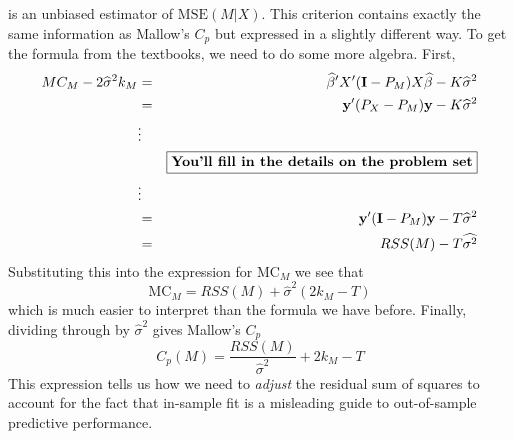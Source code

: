 \documentclass[12pt]{article}
\theoremstyle{definition}
\begin{document}
is an unbiased estimator of $\mbox{MSE}(M|X)$. This criterion contains exactly the same information as Mallow's $C_p$ but expressed in a slightly different way. To get the formula from the textbooks, we need to do some more algebra. First, 
\begin{eqnarray*}
	MC_M - 2\widehat{\sigma}^2k_M &=& \widehat{\beta}'X'(\mathbf{I} - P_M)X\widehat{\beta} - K\widehat{\sigma}^2\\
	&=& \mathbf{y}'(P_X - P_M)\mathbf{y} -  K\widehat{\sigma}^2\\
			&\vdots& \\
			&&\boxed{\mbox{\textbf{You'll fill in the details on the problem set}}}\\  
			&\vdots& \\
			&=& \mathbf{y}'(\mathbf{I} - P_M)\mathbf{y} - T\widehat{\sigma}^2\\
			&=& RSS(M) - T\widehat{\sigma^2}
\end{eqnarray*}
Substituting this into the expression for $\mbox{MC}_M$ we see that 
	$$\mbox{MC}_M = RSS(M) + \widehat{\sigma}^2(2 k_M - T)$$
which is much easier to interpret than the formula we have before. Finally, dividing through by $\widehat{\sigma}^2$ gives Mallow's $C_p$
	$$C_p(M) = \frac{RSS(M)}{\widehat{\sigma}^2} + 2k_M - T$$
This expression tells us how we need to \emph{adjust} the residual sum of squares to account for the fact that in-sample fit is a misleading guide to out-of-sample predictive performance.


\end{document}
